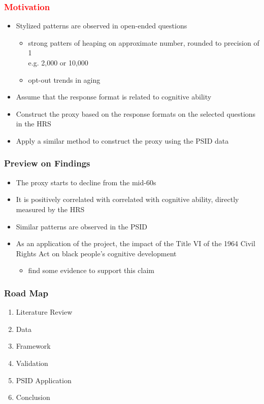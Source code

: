 \documentclass[10pt,svgnames,fragile]{beamer}
\newcommand{\REV}[1]{\textcolor{red}{#1}}
\begin{document}
\begin{frame}[label=Motivation]
	\frametitle{\REV{Motivation}}
	\begin{itemize}
		\item Stylized patterns are observed in open-ended questions
		\begin{itemize}
			\item strong patters of heaping on  approximate number, rounded to  precision of 1\\ e.g. 2,000 or 10,000 \hyperlink{figure1}{}
			\item opt-out trends in aging 
		\end{itemize}
		\item  Assume that the response format is related to cognitive ability
		\item Construct the proxy based on the response formats on the selected questions in the HRS
		
		\item Apply a similar method to construct the proxy using the PSID data
	\end{itemize}
\end{frame}

\begin{frame}
	\frametitle{Preview on Findings}
	\begin{itemize}
		\item The proxy starts to decline from the mid-60s
		\item It is positively correlated with correlated with cognitive ability, directly measured by the HRS
		\item Similar patterns are observed in the PSID
		\item As an application of the project, the impact of the Title VI of the 1964 Civil Rights Act on black people's cognitive development
		\begin{itemize}
			\item find some evidence to support this claim
		\end{itemize}
	\end{itemize}
\end{frame}


\begin{frame}
	\frametitle{Road Map}
	\begin{enumerate}
		\item Literature Review
		\vfill
		\item Data
		\vfill
		\item Framework 
		\vfill
		\item Validation
		\vfill
		\item PSID Application
		\vfill
		\item Conclusion
		\vfill
	\end{enumerate}
\end{frame}
\end{document}
